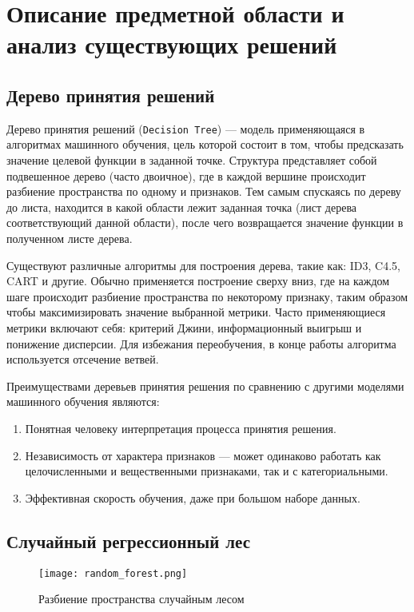 \chapter{Описание предметной области и анализ существующих решений}

\section{Дерево принятия решений}

Дерево принятия решений (\texttt{Decision Tree}) --- модель применяющаяся
в алгоритмах машинного обучения, цель которой состоит в том, чтобы предсказать
значение целевой функции в заданной точке. Структура представляет собой
подвешенное дерево (часто двоичное), где в каждой вершине происходит разбиение
пространства по одному и признаков. Тем самым спускаясь по дереву до листа,
находится в какой области лежит заданная точка (лист дерева соответствующий
данной области), после чего возвращается значение функции в полученном листе
дерева.

Существуют различные алгоритмы для построения дерева, такие как: ID3, C4.5, CART
и другие. Обычно применяется построение сверху вниз, где на каждом шаге
происходит разбиение пространства по некоторому признаку, таким образом чтобы
максимизировать значение выбранной метрики. Часто применяющиеся метрики включают
себя: критерий Джини, информационный выигрыш и понижение дисперсии. Для избежания
переобучения, в конце работы алгоритма используется отсечение ветвей.

Преимуществами деревьев принятия решения по сравнению с другими моделями
машинного обучения являются:

\begin{enumerate}
    \item Понятная человеку интерпретация процесса принятия решения.
    \item Независимость от характера признаков --- может одинаково работать как
    целочисленными и вещественными признаками, так и с категориальными.
    \item Эффективная скорость обучения, даже при большом наборе данных.
\end{enumerate}

\section{Случайный регрессионный лес}

\begin{figure}[ht!]
\caption{Разбиение пространства случайным лесом}\label{random_forest}
\texttt{[image: random\_forest.png]}
\end{figure}

